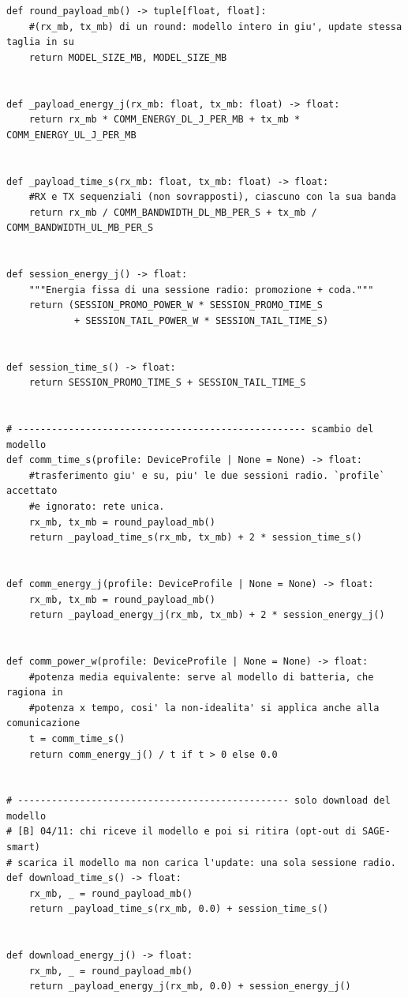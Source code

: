 \documentclass[11pt,a4paper]{article}
\begin{document}
\begin{lstlisting}[style=py,firstnumber=44,caption={\texttt{tesifl/device/communication\_model.py}, lines 44--131}]
def round_payload_mb() -> tuple[float, float]:
    #(rx_mb, tx_mb) di un round: modello intero in giu', update stessa taglia in su
    return MODEL_SIZE_MB, MODEL_SIZE_MB


def _payload_energy_j(rx_mb: float, tx_mb: float) -> float:
    return rx_mb * COMM_ENERGY_DL_J_PER_MB + tx_mb * COMM_ENERGY_UL_J_PER_MB


def _payload_time_s(rx_mb: float, tx_mb: float) -> float:
    #RX e TX sequenziali (non sovrapposti), ciascuno con la sua banda
    return rx_mb / COMM_BANDWIDTH_DL_MB_PER_S + tx_mb / COMM_BANDWIDTH_UL_MB_PER_S


def session_energy_j() -> float:
    """Energia fissa di una sessione radio: promozione + coda."""
    return (SESSION_PROMO_POWER_W * SESSION_PROMO_TIME_S
            + SESSION_TAIL_POWER_W * SESSION_TAIL_TIME_S)


def session_time_s() -> float:
    return SESSION_PROMO_TIME_S + SESSION_TAIL_TIME_S


# --------------------------------------------------- scambio del modello
def comm_time_s(profile: DeviceProfile | None = None) -> float:
    #trasferimento giu' e su, piu' le due sessioni radio. `profile` accettato
    #e ignorato: rete unica.
    rx_mb, tx_mb = round_payload_mb()
    return _payload_time_s(rx_mb, tx_mb) + 2 * session_time_s()


def comm_energy_j(profile: DeviceProfile | None = None) -> float:
    rx_mb, tx_mb = round_payload_mb()
    return _payload_energy_j(rx_mb, tx_mb) + 2 * session_energy_j()


def comm_power_w(profile: DeviceProfile | None = None) -> float:
    #potenza media equivalente: serve al modello di batteria, che ragiona in
    #potenza x tempo, cosi' la non-idealita' si applica anche alla comunicazione
    t = comm_time_s()
    return comm_energy_j() / t if t > 0 else 0.0


# ------------------------------------------------ solo download del modello
# [B] 04/11: chi riceve il modello e poi si ritira (opt-out di SAGE-smart)
# scarica il modello ma non carica l'update: una sola sessione radio.
def download_time_s() -> float:
    rx_mb, _ = round_payload_mb()
    return _payload_time_s(rx_mb, 0.0) + session_time_s()


def download_energy_j() -> float:
    rx_mb, _ = round_payload_mb()
    return _payload_energy_j(rx_mb, 0.0) + session_energy_j()



\end{lstlisting}
\end{document}
